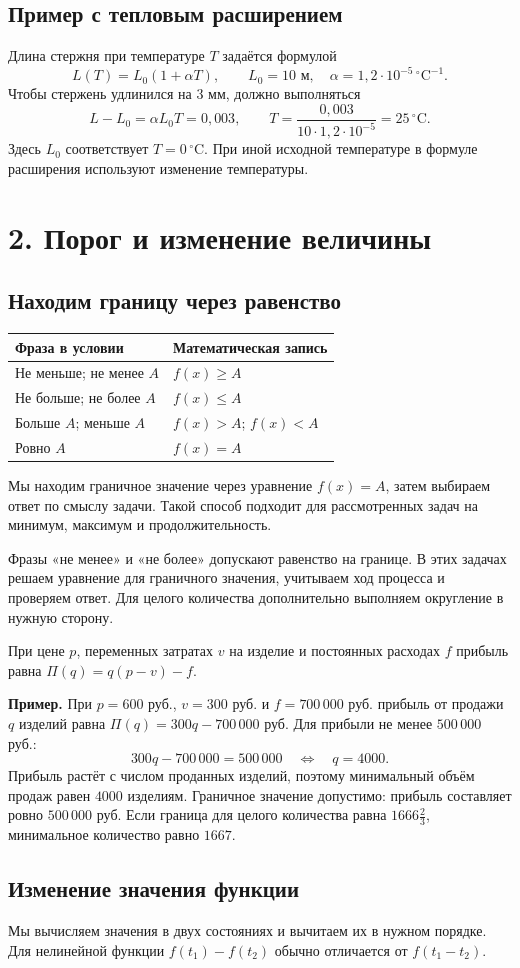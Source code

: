 \documentclass[a4paper,12pt]{article}
\newcommand{\heading}[1]{\section*{\color{darkaccent}#1}}
\newcommand{\subheading}[1]{\subsection*{\color{darkaccent}#1}}
\newcommand{\checkitem}[1]{\par\noindent\makebox[6mm][l]{$\square$}\begin{minipage}[t]{\dimexpr\linewidth-6mm\relax}\raggedright #1\end{minipage}\par}
\begin{document}
\subheading{Пример с тепловым расширением}
Длина стержня при температуре $T$ задаётся формулой
\[
L(T)=L_0(1+\alpha T),\qquad
L_0=10\text{ м},\quad \alpha=1,2\cdot10^{-5}\,{}^{\circ}\text{C}^{-1}.
\]
Чтобы стержень удлинился на $3$ мм, должно выполняться
\[
L-L_0=\alpha L_0T=0,003,\qquad
T=\frac{0,003}{10\cdot1,2\cdot10^{-5}}=25\,{}^{\circ}\text{C}.
\]
Здесь $L_0$ соответствует $T=0\,{}^{\circ}\text{C}$. При иной исходной температуре в формуле расширения используют изменение температуры.

\clearpage
\heading{2. Порог и изменение величины}
\subheading{Находим границу через равенство}
\begin{center}
\begin{tabularx}{\linewidth}{@{}lX@{}}
\toprule
Фраза в условии & Математическая запись \\
\midrule
Не меньше; не менее $A$ & $f(x)\ge A$ \\
Не больше; не более $A$ & $f(x)\le A$ \\
Больше $A$; меньше $A$ & $f(x)>A$; $f(x)<A$ \\
Ровно $A$ & $f(x)=A$ \\
\bottomrule
\end{tabularx}
\end{center}
\checkitem{Мы находим граничное значение через уравнение $f(x)=A$, затем выбираем ответ по смыслу задачи. Такой способ подходит для рассмотренных задач на минимум, максимум и продолжительность.}

Фразы «не менее» и «не более» допускают равенство на границе. В этих задачах решаем уравнение для граничного значения, учитываем ход процесса и проверяем ответ. Для целого количества дополнительно выполняем округление в нужную сторону.

При цене $p$, переменных затратах $v$ на изделие и постоянных расходах $f$ прибыль равна $\Pi(q)=q(p-v)-f$.

\textbf{Пример.} При $p=600$ руб., $v=300$ руб. и $f=700\,000$ руб. прибыль от продажи $q$ изделий равна
$\Pi(q)=300q-700\,000$ руб. Для прибыли не менее $500\,000$ руб.:
\[
300q-700\,000=500\,000
\quad\Longleftrightarrow\quad q=4000.
\]
Прибыль растёт с числом проданных изделий, поэтому минимальный объём продаж равен $4000$ изделиям. Граничное значение допустимо: прибыль составляет ровно $500\,000$ руб. Если граница для целого количества равна $1666\frac23$, минимальное количество равно $1667$.

\subheading{Изменение значения функции}
\checkitem{Мы вычисляем значения в двух состояниях и вычитаем их в нужном порядке. Для нелинейной функции $f(t_1)-f(t_2)$ обычно отличается от $f(t_1-t_2)$.}
\end{document}
